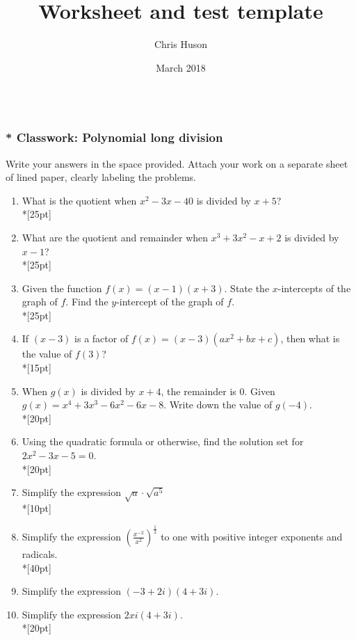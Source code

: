 \documentclass[12pt, oneside]{article}
\title{Worksheet and test template}
\author{Chris Huson}
\date{March 2018}
\begin{document}
\subsubsection*{\\* Classwork: Polynomial long division}
Write your answers in the space provided. Attach your work on a separate sheet of lined paper, clearly labeling the problems.

\begin{enumerate}



\item What is the quotient when $x^2-3x-40$ is divided by $x + 5$?\\*[25pt]

\item What are the quotient and remainder when $x^3+3x^2-x+2$ is divided by $x - 1$?\\*[25pt]

\item Given the function $f(x)=(x-1)(x+3)$. State the $x$-intercepts of the graph of $f$. Find the $y$-intercept of the graph of $f$.\\*[25pt]


\item If $(x-3)$ is a factor of $f(x)=(x-3)(ax^2+bx+c)$, then what is the value of $f(3)$?\\*[15pt]

\item When $g(x)$ is divided by $x+4$, the remainder is 0. Given $g(x)=x^4+3x^3- 6x^2- 6x-8$. Write down the value of $g(-4)$.\\*[20pt]

\item Using the quadratic formula or otherwise, find the solution set for $2x^2-3x-5=0$.\\*[20pt]

\item Simplify the expression $\sqrt{a} \cdot \sqrt{a^5}$ \\*[10pt]

\item Simplify the expression $\displaystyle \left( \frac{x^{-2}}{x^2} \right)^{\frac{1}{2}}$ to one with positive integer exponents and radicals.\\*[40pt]

\item Simplify the expression $(-3+2i)(4+3i)$.

\item Simplify the expression $2xi(4+3i)$.\\*[20pt]


\end{enumerate}
\end{document}
